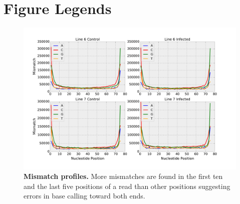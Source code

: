 \documentclass[10pt]{article}
\begin{document}



%

\section*{Figure Legends}
\begin{figure}[!ht]
\begin{center}
\includegraphics[width=6in]{error_profile.pdf}
\end{center}
\caption{
{\bf Mismatch profiles.} More mismatches are found in the first ten and the
last five positions of a read than other positions suggesting errors in base
calling toward both ends.}
\label{Figure_label}
\end{figure}
\end{document}
